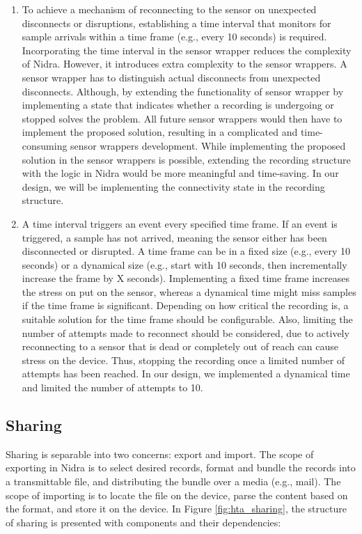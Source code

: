 \begin{enumerate}
    \item To achieve a mechanism of reconnecting to the sensor on unexpected disconnects or disruptions, establishing a time interval that monitors for sample arrivals within a time frame (e.g., every 10 seconds) is required. Incorporating the time interval in the sensor wrapper reduces the complexity of Nidra. However, it introduces extra complexity to the sensor wrappers. A sensor wrapper has to distinguish actual disconnects from unexpected disconnects. Although, by extending the functionality of sensor wrapper by implementing a state that indicates whether a recording is undergoing or stopped solves the problem. All future sensor wrappers would then have to implement the proposed solution, resulting in a complicated and time-consuming sensor wrappers development. While implementing the proposed solution in the sensor wrappers is possible, extending the recording structure with the logic in Nidra would be more meaningful and time-saving. In our design, we will be implementing the connectivity state in the recording structure.
    \item A time interval triggers an event every specified time frame. If an event is triggered, a sample has not arrived, meaning the sensor either has been disconnected or disrupted. A time frame can be in a fixed size (e.g., every 10 seconds) or a dynamical size (e.g., start with 10 seconds, then incrementally increase the frame by X seconds). Implementing a fixed time frame increases the stress on put on the sensor, whereas a dynamical time might miss samples if the time frame is significant. Depending on how critical the recording is, a suitable solution for the time frame should be configurable. Also, limiting the number of attempts made to reconnect should be considered, due to actively reconnecting to a sensor that is dead or completely out of reach can cause stress on the device. Thus, stopping the recording once a limited number of attempts has been reached.  In our design, we implemented a dynamical time and limited the number of attempts to 10. 
\end{enumerate}

\subsection{Sharing}

Sharing is separable into two concerns: export and import. The scope of exporting in Nidra is to select desired records, format and bundle the records into a transmittable file, and distributing the bundle over a media (e.g., mail). The scope of importing is to locate the file on the device, parse the content based on the format, and store it on the device. In Figure \ref{fig:hta_sharing}, the structure of sharing is presented with components and their dependencies: 

